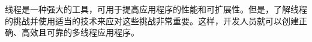 线程是一种强大的工具，可用于提高应用程序的性能和可扩展性。但是，了解线程的挑战并使用适当的技术来应对这些挑战非常重要。这样，开发人员就可以创建正确、高效且可靠的多线程应用程序。


















